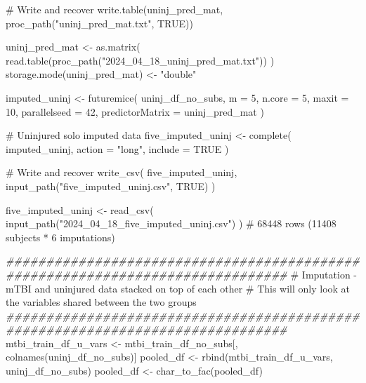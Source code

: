 \documentclass[
  letterpaper,
  DIV=11,
  numbers=noendperiod]{scrreprt}
\newenvironment{Shaded}{\begin{snugshade}}{\end{snugshade}}
\newcommand{\AttributeTok}[1]{\textcolor[rgb]{0.40,0.45,0.13}{#1}}
\newcommand{\CommentTok}[1]{\textcolor[rgb]{0.37,0.37,0.37}{#1}}
\newcommand{\ConstantTok}[1]{\textcolor[rgb]{0.56,0.35,0.01}{#1}}
\newcommand{\DecValTok}[1]{\textcolor[rgb]{0.68,0.00,0.00}{#1}}
\newcommand{\DocumentationTok}[1]{\textcolor[rgb]{0.37,0.37,0.37}{\textit{#1}}}
\newcommand{\FunctionTok}[1]{\textcolor[rgb]{0.28,0.35,0.67}{#1}}
\newcommand{\NormalTok}[1]{\textcolor[rgb]{0.00,0.23,0.31}{#1}}
\newcommand{\OtherTok}[1]{\textcolor[rgb]{0.00,0.23,0.31}{#1}}
\newcommand{\StringTok}[1]{\textcolor[rgb]{0.13,0.47,0.30}{#1}}
\begin{document}
\begin{Shaded}
\begin{Highlighting}[]
\CommentTok{\# Write and recover}
\FunctionTok{write.table}\NormalTok{(uninj\_pred\_mat, }\FunctionTok{proc\_path}\NormalTok{(}\StringTok{"uninj\_pred\_mat.txt"}\NormalTok{, }\ConstantTok{TRUE}\NormalTok{))}

\NormalTok{uninj\_pred\_mat }\OtherTok{\textless{}{-}} \FunctionTok{as.matrix}\NormalTok{(}
    \FunctionTok{read.table}\NormalTok{(}\FunctionTok{proc\_path}\NormalTok{(}\StringTok{"2024\_04\_18\_uninj\_pred\_mat.txt"}\NormalTok{))}
\NormalTok{)}
\FunctionTok{storage.mode}\NormalTok{(uninj\_pred\_mat) }\OtherTok{\textless{}{-}} \StringTok{"double"}

\NormalTok{imputed\_uninj }\OtherTok{\textless{}{-}} \FunctionTok{futuremice}\NormalTok{(}
\NormalTok{    uninj\_df\_no\_subs,}
    \AttributeTok{m =} \DecValTok{5}\NormalTok{,}
    \AttributeTok{n.core =} \DecValTok{5}\NormalTok{,}
    \AttributeTok{maxit =} \DecValTok{10}\NormalTok{,}
    \AttributeTok{parallelseed =} \DecValTok{42}\NormalTok{,}
    \AttributeTok{predictorMatrix =}\NormalTok{ uninj\_pred\_mat}
\NormalTok{)}

\CommentTok{\# Uninjured solo imputed data}
\NormalTok{five\_imputed\_uninj }\OtherTok{\textless{}{-}} \FunctionTok{complete}\NormalTok{(}
\NormalTok{    imputed\_uninj,}
    \AttributeTok{action =} \StringTok{"long"}\NormalTok{,}
    \AttributeTok{include =} \ConstantTok{TRUE}
\NormalTok{)}

\CommentTok{\# Write and recover}
\FunctionTok{write\_csv}\NormalTok{(}
\NormalTok{    five\_imputed\_uninj,}
    \FunctionTok{input\_path}\NormalTok{(}\StringTok{"five\_imputed\_uninj.csv"}\NormalTok{, }\ConstantTok{TRUE}\NormalTok{)}
\NormalTok{)}

\NormalTok{five\_imputed\_uninj }\OtherTok{\textless{}{-}} \FunctionTok{read\_csv}\NormalTok{(}
    \FunctionTok{input\_path}\NormalTok{(}\StringTok{"2024\_04\_18\_five\_imputed\_uninj.csv"}\NormalTok{)}
\NormalTok{) }\CommentTok{\# 68448 rows (11408 subjects * 6 imputations)}

\DocumentationTok{\#\#\#\#\#\#\#\#\#\#\#\#\#\#\#\#\#\#\#\#\#\#\#\#\#\#\#\#\#\#\#\#\#\#\#\#\#\#\#\#\#\#\#\#\#\#\#\#\#\#\#\#\#\#\#\#\#\#\#\#\#\#\#\#\#\#\#\#\#\#\#\#\#\#\#\#\#\#\#}
\CommentTok{\# Imputation {-} mTBI and uninjured data stacked on top of each other}
\CommentTok{\# This will only look at the variables shared between the two groups}
\DocumentationTok{\#\#\#\#\#\#\#\#\#\#\#\#\#\#\#\#\#\#\#\#\#\#\#\#\#\#\#\#\#\#\#\#\#\#\#\#\#\#\#\#\#\#\#\#\#\#\#\#\#\#\#\#\#\#\#\#\#\#\#\#\#\#\#\#\#\#\#\#\#\#\#\#\#\#\#\#\#\#\#}
\NormalTok{mtbi\_train\_df\_u\_vars }\OtherTok{\textless{}{-}}\NormalTok{ mtbi\_train\_df\_no\_subs[, }\FunctionTok{colnames}\NormalTok{(uninj\_df\_no\_subs)]}
\NormalTok{pooled\_df }\OtherTok{\textless{}{-}} \FunctionTok{rbind}\NormalTok{(mtbi\_train\_df\_u\_vars, uninj\_df\_no\_subs)}
\NormalTok{pooled\_df }\OtherTok{\textless{}{-}} \FunctionTok{char\_to\_fac}\NormalTok{(pooled\_df)}


\end{Highlighting}
\end{Shaded}
\end{document}
